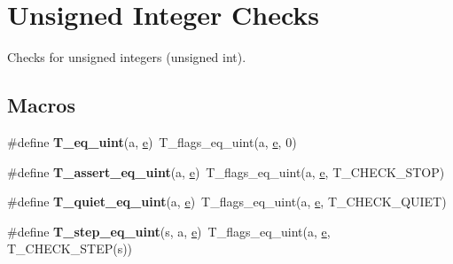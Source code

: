 \hypertarget{group__RTEMSTestFrameworkChecksUInt}{}\section{Unsigned Integer Checks}
\label{group__RTEMSTestFrameworkChecksUInt}


Checks for unsigned integers (unsigned int).  


\subsection*{Macros}
\begin{DoxyCompactItemize}
\item 
\mbox{\label{group__RTEMSTestFrameworkChecksUInt_ga213c9e95e2f9582edf29ed899eb5d29e}} 
\#define {\bfseries T\+\_\+eq\+\_\+uint}(a,  \mbox{\hyperlink{sun4u_2tte_8h_a8b0b9ed08e0e18920ec2682f48228c27}{e}})~T\+\_\+flags\+\_\+eq\+\_\+uint(a, \mbox{\hyperlink{sun4u_2tte_8h_a8b0b9ed08e0e18920ec2682f48228c27}{e}}, 0)
\item 
\mbox{\label{group__RTEMSTestFrameworkChecksUInt_ga6845ad63dff29bb37dcd889d5fbe939b}} 
\#define {\bfseries T\+\_\+assert\+\_\+eq\+\_\+uint}(a,  \mbox{\hyperlink{sun4u_2tte_8h_a8b0b9ed08e0e18920ec2682f48228c27}{e}})~T\+\_\+flags\+\_\+eq\+\_\+uint(a, \mbox{\hyperlink{sun4u_2tte_8h_a8b0b9ed08e0e18920ec2682f48228c27}{e}}, T\+\_\+\+C\+H\+E\+C\+K\+\_\+\+S\+T\+OP)
\item 
\mbox{\label{group__RTEMSTestFrameworkChecksUInt_ga2d1d192cb038fcebe09405bd1450481f}} 
\#define {\bfseries T\+\_\+quiet\+\_\+eq\+\_\+uint}(a,  \mbox{\hyperlink{sun4u_2tte_8h_a8b0b9ed08e0e18920ec2682f48228c27}{e}})~T\+\_\+flags\+\_\+eq\+\_\+uint(a, \mbox{\hyperlink{sun4u_2tte_8h_a8b0b9ed08e0e18920ec2682f48228c27}{e}}, T\+\_\+\+C\+H\+E\+C\+K\+\_\+\+Q\+U\+I\+ET)
\item 
\mbox{\label{group__RTEMSTestFrameworkChecksUInt_ga90bd526fc3ddefb5f76d79faf59807b8}} 
\#define {\bfseries T\+\_\+step\+\_\+eq\+\_\+uint}(s,  a,  \mbox{\hyperlink{sun4u_2tte_8h_a8b0b9ed08e0e18920ec2682f48228c27}{e}})~T\+\_\+flags\+\_\+eq\+\_\+uint(a, \mbox{\hyperlink{sun4u_2tte_8h_a8b0b9ed08e0e18920ec2682f48228c27}{e}}, T\+\_\+\+C\+H\+E\+C\+K\+\_\+\+S\+T\+EP(s))

\end{DoxyCompactItemize}
